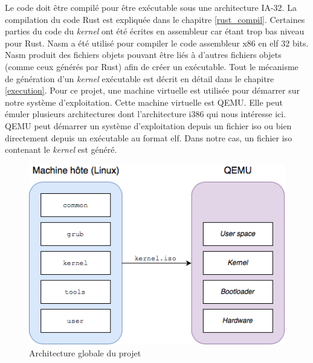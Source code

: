Le code doit être compilé pour être exécutable sous une architecture \acrshort{IA-32}.
La compilation du code Rust est expliquée dans le chapitre \ref{rust_compil}. Certaines
parties du code du \textit{kernel} ont été écrites en assembleur car étant trop bas niveau
pour Rust. Nasm a été  utilisé pour compiler le code assembleur x86 en \acrshort{elf}
32 bits. Nasm produit des fichiers objets pouvant être liés à d'autres fichiers
objets (comme ceux générés par Rust) afin de créer un exécutable. Tout le mécanisme
de génération d'un \textit{kernel} exécutable est décrit en détail dans le chapitre
\ref{execution}. Pour ce projet, une machine virtuelle est utilisée pour démarrer
sur notre système d'exploitation. Cette machine virtuelle est QEMU. Elle peut
émuler plusieurs architectures dont l'architecture i386 qui nous intéresse ici.
QEMU peut démarrer un système d'exploitation depuis un fichier \acrshort{iso}
ou bien directement depuis un exécutable au format \acrshort{elf}. Dans notre
cas, un fichier \acrshort{iso} contenant le \textit{kernel} est généré.

\begin{figure}[!h]
    \centering
    \includegraphics[scale=0.75]{images/global_arch.png}
    \caption{Architecture globale du projet}
    \label{os_arch}
\end{figure}